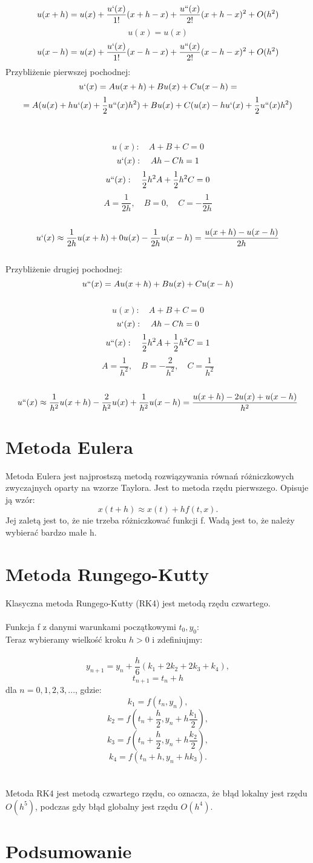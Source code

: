 \documentclass[a4paper,12pt]{article}
\begin{document}
$$u(x+h) = u(x) + \frac{u`(x)}{1!}(x+h-x)+\frac{u``(x)}{2!}(x+h-x)^2+O(h^2)$$
$$u(x)=u(x)$$
$$u(x-h) = u(x) + \frac{u`(x)}{1!}(x-h-x)+\frac{u``(x)}{2!}(x-h-x)^2+O(h^2)$$
Przybliżenie pierwszej pochodnej:
$$u`(x)=Au(x+h)+Bu(x)+Cu(x-h)=$$$$= A(u(x)+hu`(x)+\frac{1}{2}u``(x)h^2)+Bu(x)+C(u(x)-hu`(x)+\frac{1}{2}u``(x)h^2)$$
\\ \\
$$u(x): \quad A+B+C=0$$
$$u`(x): \quad Ah-Ch=1$$
$$u``(x): \quad \frac{1}{2}h^2A+\frac{1}{2}h^2C=0$$
$$A=\frac{1}{2h},\quad B=0, \quad C=-\frac{1}{2h}$$\\
$$u`(x) \approx \frac{1}{2h}u(x+h)+0u(x)-\frac{1}{2h}u(x-h)=\frac{u(x+h)-u(x-h)}{2h} $$\\
Przybliżenie drugiej pochodnej: 
$$u``(x)=Au(x+h)+Bu(x)+Cu(x-h)$$\\
$$u(x): \quad A+B+C=0$$
$$u`(x): \quad Ah-Ch=0$$
$$u``(x): \quad \frac{1}{2}h^2A+\frac{1}{2}h^2C=1$$
$$A=\frac{1}{h^2},\quad B=-\frac{2}{h^2},\quad C=\frac{1}{h^2}$$
\\
$$u``(x)\approx\frac{1}{h^2}u(x+h)-\frac{2}{h^2}u(x)+\frac{1}{h^2}u(x-h)
=\frac{u(x+h)-2u(x)+u(x-h)}{h^2}$$
\section{Metoda Eulera}
Metoda Eulera jest najprostszą metodą rozwiązywania równań
różniczkowych zwyczajnych oparty na wzorze Taylora. Jest to
metoda rzędu pierwszego. Opisuje ją wzór:
$$x(t+h) \approx x(t) +hf(t,x).$$
Jej zaletą jest to, że nie trzeba różniczkować funkcji f. Wadą jest to, że należy wybierać bardzo małe h.
\section{Metoda Rungego-Kutty}
Klasyczna metoda Rungego-Kutty (RK4) jest metodą rzędu czwartego.
\\ \\
Funkcja f z danymi warunkami początkowymi $t_0,y_0:$ 
\\ 
Teraz wybieramy wielkość kroku $h>0$ i zdefiniujmy:
\\ \\
$$y_{n+1}=y_n +\frac{h}{6}(k_1+2k_2+2k_3+k_4),$$
$$t_{n+1}=t_n +h$$
dla $n=0,1,2,3,...$, gdzie:
$$k_1 = f(t_n,y_n),$$
$$k_2 = f(t_n +\frac{h}{2}, y_n +h\frac{k_1}{2}),$$
$$k_3 = f(t_n + \frac{h}{2}, y_n +h\frac{k_2}{2}),$$
$$k_4=f(t_n+h,y_n+hk_3).$$
\\ \\ 
Metoda RK4 jest metodą czwartego rzędu, co oznacza, że błąd lokalny jest rzędu $O(h^5)$, podczas gdy błąd globalny jest rzędu $O(h^4)$.
\section{Podsumowanie}
\end{document}
